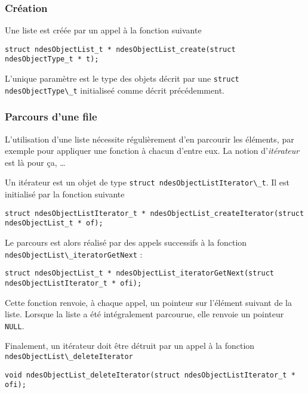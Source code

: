 \subsubsection{Création}

   Une liste est créée par un appel à la fonction suivante

\begin{verbatim}
struct ndesObjectList_t * ndesObjectList_create(struct ndesObjectType_t * t);
\end{verbatim}

   L'unique paramètre est le type des objets décrit par une
\lstinline{struct ndesObjectType\_t} initialiseé comme décrit
précédemment.

%
\subsubsection{Parcours d'une file}

   L'utilisation d'une liste nécessite régulièrement d'en parcourir
les éléments, par exemple pour appliquer une fonction à chacun d'entre
eux. La notion d'{\em itérateur} est là pour ça, \ldots

   Un itérateur est un objet de type \lstinline{struct ndesObjectListIterator\_t}.
 Il est initialisé par la fonction
suivante 

\begin{verbatim}
struct ndesObjectListIterator_t * ndesObjectList_createIterator(struct
ndesObjectList_t * of);
\end{verbatim}

   Le parcours est alors réalisé par des appels successifs à la
fonction \lstinline{ndesObjectList\_iteratorGetNext} :

\begin{verbatim}
struct ndesObjectList_t * ndesObjectList_iteratorGetNext(struct ndesObjectListIterator_t * ofi);
\end{verbatim}

   Cette fonction renvoie, à chaque appel, un pointeur sur l'élément
suivant de la liste. Lorsque la liste a été intégralement parcourue,
elle renvoie un pointeur {\tt NULL}.

   Finalement, un itérateur doit être détruit par un appel à la
fonction \lstinline{ndesObjectList\_deleteIterator}

\begin{verbatim}
void ndesObjectList_deleteIterator(struct ndesObjectListIterator_t * ofi);
\end{verbatim}
